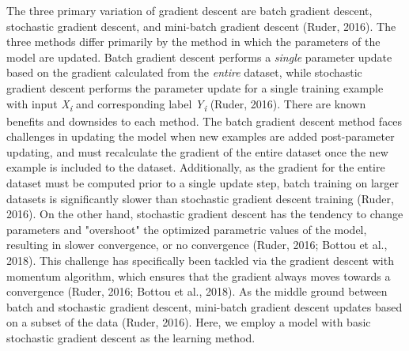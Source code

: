 \documentclass[11pt,titlepage]{article}
\begin{document}
The three primary variation of gradient descent are batch gradient descent, stochastic gradient descent, and mini-batch gradient descent (Ruder, 2016). The three methods differ primarily by the method in which the parameters of the model are updated. Batch gradient descent performs a \textit{single} parameter update based on the gradient calculated from the \textit{entire} dataset, while stochastic gradient descent performs the parameter update for a single training example with input \textit{X\textsubscript{i}} and corresponding label \textit{Y\textsubscript{i}} (Ruder, 2016). There are known benefits and downsides to each method. The batch gradient descent method faces challenges in updating the model when new examples are added post-parameter updating, and must recalculate the gradient of the entire dataset once the new example is included to the dataset. Additionally, as the gradient for the entire dataset must be computed prior to a single update step, batch training on larger datasets is significantly slower than stochastic gradient descent training (Ruder, 2016). On the other hand, stochastic gradient descent has the tendency to change parameters and "overshoot" the optimized parametric values of the model, resulting in slower convergence, or no convergence (Ruder, 2016; Bottou et al., 2018). This challenge has specifically been tackled via the gradient descent with momentum algorithm, which ensures that the gradient always moves towards a convergence (Ruder, 2016; Bottou et al., 2018). As the middle ground between batch and stochastic gradient descent, mini-batch gradient descent updates based on a subset of the data (Ruder, 2016). Here, we employ a model with basic stochastic gradient descent as the learning method.\par
\end{document}
